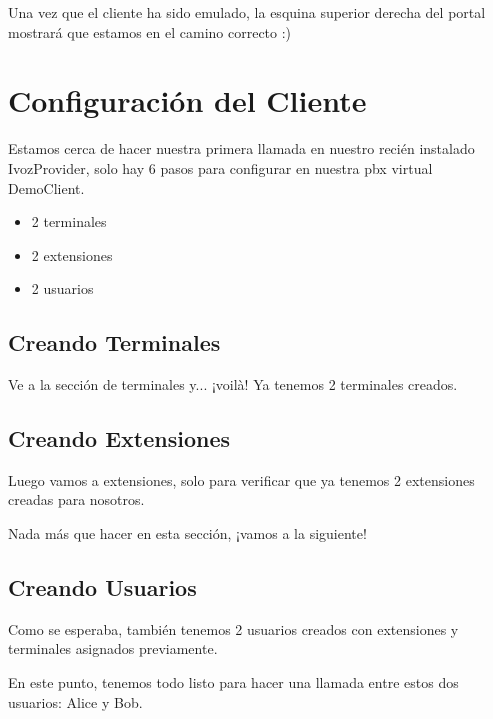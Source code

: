 \documentclass[letterpaper,10pt,spanish]{sphinxmanual}
\begin{document}
Una vez que el cliente ha sido emulado, la esquina superior derecha del portal mostrará que estamos en el camino correcto :)


\section{Configuración del Cliente}
\label{getting_started/internal_calls/client_portal:client-configuration}\label{getting_started/internal_calls/client_portal::doc}\label{getting_started/internal_calls/client_portal:id1}
Estamos cerca de hacer nuestra primera llamada en nuestro recién instalado IvozProvider, solo hay 6 pasos para configurar en nuestra pbx virtual DemoClient.
\begin{itemize}
\item {} 
2 terminales

\item {} 
2 extensiones

\item {} 
2 usuarios

\end{itemize}


\subsection{Creando Terminales}
\label{getting_started/internal_calls/client_portal:creating-terminals}
Ve a la sección de terminales y... ¡voilà! Ya tenemos 2 terminales creados.


\subsection{Creando Extensiones}
\label{getting_started/internal_calls/client_portal:creating-extensions}
Luego vamos a extensiones, solo para verificar que ya tenemos 2 extensiones creadas para nosotros.

Nada más que hacer en esta sección, ¡vamos a la siguiente!


\subsection{Creando Usuarios}
\label{getting_started/internal_calls/client_portal:creating-users}
Como se esperaba, también tenemos 2 usuarios creados con extensiones y terminales asignados previamente.

En este punto, tenemos todo listo para hacer una llamada entre estos dos usuarios: Alice y Bob.
\end{document}
